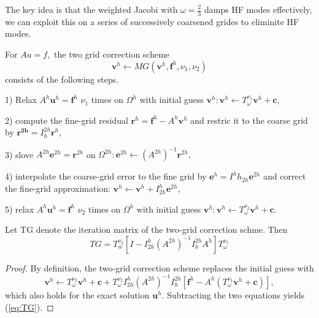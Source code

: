   \begin{rem}
    The key idea is that the weighted Jacobi with $\omega
    =\frac{2}{3}$
    damps HF modes effectively,
    we can exploit this on a series of successively coarsened grides
    to eliminite HF modes.
  \end{rem}

  \begin{defn}
    For $Au=f,$
    the two grid correction scheme
    \begin{equation}
      \mathbf{v}^h\leftarrow  MG(\mathbf{v}^h,\mathbf{f}^h,\nu_1,\nu_2)
    \end{equation}
    consists of the following steps.
    
    1) Relax $A^h\mathbf{u}^h=\mathbf{f}^h$ $\nu_1$
    times on $\Omega^h$ with initial guess
    $\mathbf{v}^h:\mathbf{v}^h\leftarrow
    T_{\omega}^{\nu_1}\mathbf{v}^h +\mathbf{c}$,

    2) compute the fine-grid residual $\mathbf{r}^h=\mathbf{f}^h-
    A^h\mathbf{v}^h$ and restric it to the coarse grid by
    $\mathbf{r^{2h}}=I^{2h}_h\mathbf{r}^h$,

    3) slove $A^{2h}\mathbf{e}^{2h}=\mathbf{r}^{2h}$
    on $\Omega^{2h}: \mathbf{e}^{2h}\leftarrow
    (A^{2h})^{-1}\mathbf{r}^{2h},$
    
    4) interpolate the coarse-grid error to the fine grid by
    $\mathbf{e}^h=I^hh_{2h}\mathbf{e}^{2h}$
    and correct the fine-grid approximation:
    $\mathbf{v}^h\leftarrow \mathbf{v}^h+I^h_{2h}\mathbf{e}^{2h}$,

    5) relax $A^h\mathbf{u}^h=\mathbf{f}^{h}$ $\nu_2$ times
    on $\Omega^h$ with initial guess
    $\mathbf{v}^h:\mathbf{v}^h\leftarrow
    T_{\omega}^{\nu_2}\mathbf{v}^h
    +\mathbf{c}.$
  \end{defn}
  
  \begin{prop}
 Let TG denote the iteration matrix of the two-grid correction schme.
Then
\begin{equation}
\label{eq:TG}
  TG=T^{\nu_2}_{w}[I-I^h_{2h}(A^{2h})^{-1}I^{2h}_hA^h]T^{\nu_1}_{\omega}
\end{equation}
  \end{prop}

  \begin{proof}
    By definition,
the two-grid correction scheme replaces
the initial guess with
\begin{equation}
  \mathbf{v}^h\leftarrow  
T^{\nu_2}_{\omega}\mathbf{v}^h
+\mathbf{c}+T^{\nu_2}_{\omega}I^h_{2h}(A^{2h})^{-1}I^{2h}_h
[\mathbf{f}^h-A^h(T_{\omega}^{\nu_1}\mathbf{v}^h+\mathbf{c})],
\end{equation}
which also holds for the exact solution $\mathbf{u}^h$.
Subtracting the two equations yields (\ref{eq:TG}).
  \end{proof}

